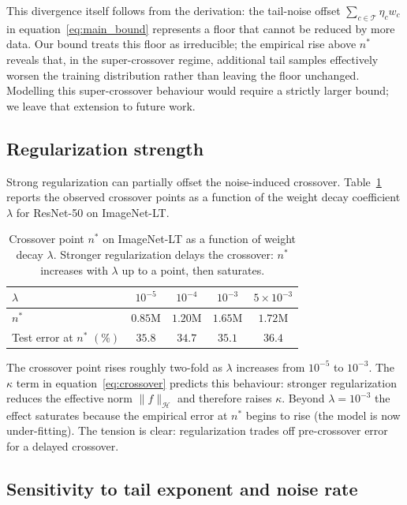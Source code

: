 \documentclass[11pt]{article}
\begin{document}
This divergence itself follows from the derivation: the tail-noise offset $\sum_{c \in \mathcal{T}} \eta_c w_c$ in equation~\eqref{eq:main_bound} represents a floor that cannot be reduced by more data. Our bound treats this floor as irreducible; the empirical rise above $n^{*}$ reveals that, in the super-crossover regime, additional tail samples effectively worsen the training distribution rather than leaving the floor unchanged. Modelling this super-crossover behaviour would require a strictly larger bound; we leave that extension to future work.

\subsection{Regularization strength}

Strong regularization can partially offset the noise-induced crossover. Table~\ref{tab:reg} reports the observed crossover points as a function of the weight decay coefficient $\lambda$ for ResNet-50 on ImageNet-LT.

\begin{table}[h]
\centering
\caption{Crossover point $n^{*}$ on ImageNet-LT as a function of weight decay $\lambda$. Stronger regularization delays the crossover: $n^{*}$ increases with $\lambda$ up to a point, then saturates.}
\label{tab:reg}
\begin{tabular}{lcccc}
\toprule
$\lambda$ & $10^{-5}$ & $10^{-4}$ & $10^{-3}$ & $5 \times 10^{-3}$ \\
\midrule
$n^{*}$ & $0.85\text{M}$ & $1.20\text{M}$ & $1.65\text{M}$ & $1.72\text{M}$ \\
Test error at $n^{*}$ $(\%)$ & $35.8$ & $34.7$ & $35.1$ & $36.4$ \\
\bottomrule
\end{tabular}
\end{table}

The crossover point rises roughly two-fold as $\lambda$ increases from $10^{-5}$ to $10^{-3}$. The $\kappa$ term in equation~\eqref{eq:crossover} predicts this behaviour: stronger regularization reduces the effective norm $\|f\|_{\mathcal{H}}$ and therefore raises $\kappa$. Beyond $\lambda = 10^{-3}$ the effect saturates because the empirical error at $n^{*}$ begins to rise (the model is now under-fitting). The tension is clear: regularization trades off pre-crossover error for a delayed crossover.

\subsection{Sensitivity to tail exponent and noise rate}
\end{document}
